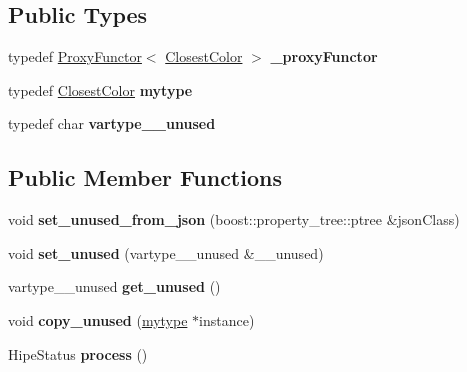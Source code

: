 \subsection*{Public Types}
\begin{DoxyCompactItemize}
\item 
\mbox{\label{classfilter_1_1algos_1_1_closest_color_ae0a71e75e3c30026ca08d255c3ef435d}} 
typedef \hyperlink{class_proxy_functor}{Proxy\+Functor}$<$ \hyperlink{classfilter_1_1algos_1_1_closest_color}{Closest\+Color} $>$ {\bfseries \+\_\+proxy\+Functor}
\item 
\mbox{\label{classfilter_1_1algos_1_1_closest_color_a20d50a313d53f976513d839c5be7e141}} 
typedef \hyperlink{classfilter_1_1algos_1_1_closest_color}{Closest\+Color} {\bfseries mytype}
\item 
\mbox{\label{classfilter_1_1algos_1_1_closest_color_a48b11a500ffe54615d30459590d02093}} 
typedef char {\bfseries vartype\+\_\+\+\_\+unused}
\end{DoxyCompactItemize}
\subsection*{Public Member Functions}
\begin{DoxyCompactItemize}
\item 
\mbox{\label{classfilter_1_1algos_1_1_closest_color_ae82a29578a1f2994255cc7f94c8075b2}} 
void {\bfseries set\+\_\+unused\+\_\+from\+\_\+json} (boost\+::property\+\_\+tree\+::ptree \&json\+Class)
\item 
\mbox{\label{classfilter_1_1algos_1_1_closest_color_a24c2bca6599de15dc554c8b986a7c0dc}} 
void {\bfseries set\+\_\+unused} (vartype\+\_\+\+\_\+unused \&\+\_\+\+\_\+unused)
\item 
\mbox{\label{classfilter_1_1algos_1_1_closest_color_a77834722f2e37856e9cc07e3ba7f3cf4}} 
vartype\+\_\+\+\_\+unused {\bfseries get\+\_\+unused} ()
\item 
\mbox{\label{classfilter_1_1algos_1_1_closest_color_a8fe2e96e220281c02ec20bc6ddc96d49}} 
void {\bfseries copy\+\_\+unused} (\hyperlink{classfilter_1_1algos_1_1_closest_color}{mytype} $\ast$instance)
\item 
\mbox{\label{classfilter_1_1algos_1_1_closest_color_a82b98028ba717ac548f47013f101f34f}} 
Hipe\+Status {\bfseries process} ()
\end{DoxyCompactItemize}
